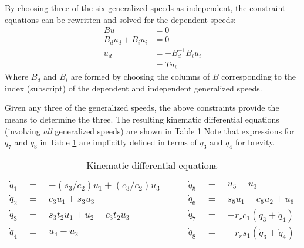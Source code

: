 \documentclass[letterpaper,11pt]{article}
\begin{document}
By choosing three of the six generalized speeds as independent, the constraint
equations can be rewritten and solved for the dependent speeds:
\begin{align*}
  B u & = 0 \\
  B_d u_d + B_i u_i & = 0 \\
  u_d & = -B_d^{-1} B_i u_i \\
      & = T u_i
\end{align*}
Where $B_d$ and $B_i$ are formed by choosing the columns of $B$ corresponding
to the index (subscript) of the dependent and independent generalized speeds.

Given any three of the generalized speeds, the above constraints provide the
means to determine the three.  The resulting kinematic differential equations
(involving {\it{all}} generalized speeds) are shown in Table \ref{kindiffs}
Note that expressions for $\dot{q}_7$ and $\dot{q}_8$ in Table \ref{kindiffs}
are implicitly defined in terms of $\dot{q}_3$ and $\dot{q}_4$ for brevity.

\begin{table}[!h]
  \begin{center}
    \begin{tabular}{rclcrcl}
        $\dot{q}_1$ & $=$ & $-(s_3/c_2) u_1 + (c_3/c_2) u_3$ &$\quad$&
        $\dot{q}_5$ & $=$ & $u_5 - u_3$ \\
        $\dot{q}_2$ & $=$ & $c_3 u_1 + s_3 u_3$ &$\quad$&
        $\dot{q}_6$ & $=$ & $s_5 u_1 - c_5 u_2 + u_6$ \\
        $\dot{q}_3$ & $=$ & $s_3 t_2 u_1 + u_2 - c_3 t_2 u_3$ &$\quad$&
        $\dot{q}_7$ & $=$ & $-r_r c_1 (\dot{q}_3 + \dot{q}_4)$ \\
        $\dot{q}_4$ & $=$ & $u_4 - u_2$ & $\quad$ &
        $\dot{q}_8$ & $=$ & $-r_r s_1 (\dot{q}_3 + \dot{q}_4)$
    \end{tabular}
  \end{center}
  \caption{Kinematic differential equations}
  \label{kindiffs}
\end{table}



\end{document}
